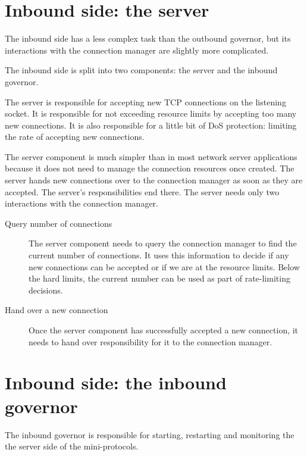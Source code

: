 \section{Inbound side: the server}

The inbound side has a less complex task than the outbound governor, but its
interactions with the connection manager are slightly more complicated.

The inbound side is split into two components: the server and the inbound governor.

The server is responsible for accepting new TCP connections on the listening
socket. It is responsible for not exceeding resource limits by accepting too
many new connections. It is also responsible for a little bit of DoS protection:
limiting the rate of accepting new connections.

The server component is much simpler than in most network server applications
because it does not need to manage the connection resources once created. The
server hands new connections over to the connection manager as soon as they are
accepted. The server's responsibilities end there. The server needs only two
interactions with the connection manager.
\begin{description}
\item[Query number of connections] The server component needs to query the
  connection manager to find the current number of connections. It uses this
  information to decide if any new connections can be accepted or if we are
  at the resource limits. Below the hard limits, the current number can be used
  as part of rate-limiting decisions.

\item[Hand over a new connection] Once the server component has successfully
  accepted a new connection, it needs to hand over responsibility for it to
  the connection manager.
\end{description}


\section{Inbound side: the inbound governor}

The inbound governor is responsible for starting, restarting and monitoring the
the server side of the mini-protocols.

